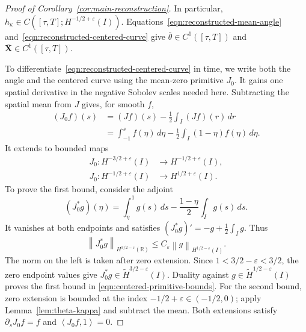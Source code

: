 \documentclass[11pt,reqno]{amsart}
\theoremstyle{plain}
\theoremstyle{definition}
\numberwithin{equation}{section}
\newcommand{\p}{\partial}
\newcommand{\wt}[1]{\widetilde{#1}}
\newcommand{\bm}[1]{\boldsymbol{#1}}
\newcommand{\norm}[1]{\left\lVert #1 \right\rVert}
\newcommand{\dual}[2]{\left\langle #1,#2 \right\rangle}
\newcommand{\R}{\mathbb{R}}
\newcommand{\hi}[1]{H^{#1}(I)}
\newcommand{\thi}[1]{\wt H^{#1}(I)}
\newcommand{\hr}[1]{H^{#1}(\R)}
\begin{document}
\begin{proof}[Proof of Corollary~\ref{cor:main-reconstruction}]
In particular, $h_\kappa\in C([\tau,T];H^{-1/2+\varepsilon}(I))$.
Equations~\eqref{eqn:reconstructed-mean-angle} and~\eqref{eqn:reconstructed-centered-curve} give
$\bar\theta\in C^1([\tau,T])$ and
$\overline{\bm X}\in C^1([\tau,T])$.

To differentiate~\eqref{eqn:reconstructed-centered-curve} in time, we
write both the angle and the centered curve using the mean-zero
primitive $J_0$. It gains one spatial derivative in the negative
Sobolev scales needed here. Subtracting the spatial mean from $J$ gives,
for smooth $f$,
\begin{equation}\label{eqn:centered-primitive}
\begin{aligned}
    (J_0f)(s)
    &=(Jf)(s)-\frac12\int_I(Jf)(r)\,dr\\
    &=\int_{-1}^s f(\eta)\,d\eta
        -\frac12\int_I(1-\eta)f(\eta)\,d\eta.
\end{aligned}
\end{equation}
It extends to bounded maps
\begin{equation}\label{eqn:centered-primitive-bounds}
\begin{aligned}
    J_0:H^{-3/2+\varepsilon}(I)&\longrightarrow
        H^{-1/2+\varepsilon}(I),\\
    J_0:H^{-1/2+\varepsilon}(I)&\longrightarrow
        H^{1/2+\varepsilon}(I).
\end{aligned}
\end{equation}
To prove the first bound, consider the adjoint
\begin{equation*}
    (J_0^*g)(\eta)
    =\int_\eta^1 g(s)\,ds
        -\frac{1-\eta}{2}\int_I g(s)\,ds.
\end{equation*}
It vanishes at both endpoints and satisfies
$(J_0^*g)'=-g+\frac12\int_I g$. Thus
\begin{equation*}
    \norm{J_0^*g}_{\hr{3/2-\varepsilon}}
    \le C_\varepsilon\norm{g}_{\hi{1/2-\varepsilon}}.
\end{equation*}
The norm on the left is taken after zero extension. Since
$1<3/2-\varepsilon<3/2$, the zero endpoint values give
$J_0^*g\in\thi{3/2-\varepsilon}$.
Duality against $g\in\thi{1/2-\varepsilon}$ proves the first bound in
\eqref{eqn:centered-primitive-bounds}.
For the second bound, zero extension is bounded at the index
$-1/2+\varepsilon\in(-1/2,0)$; apply Lemma~\ref{lem:theta-kappa} and
subtract the mean. Both extensions satisfy
$\p_sJ_0f=f$ and $\dual{J_0f}{1}=0$.


\end{proof}
\end{document}
